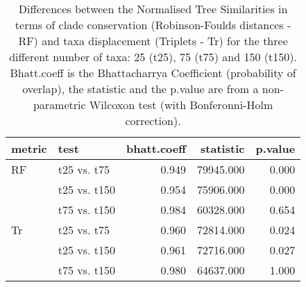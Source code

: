 \begin{table}[ht]
\centering
\begin{tabular}{llr|rr}
  \hline
metric & test & bhatt.coeff & statistic & p.value \\ 
  \hline
RF & t25 vs. t75 & 0.949 & 79945.000 & 0.000 \\ 
   & t25 vs. t150 & 0.954 & 75906.000 & 0.000 \\ 
   & t75 vs. t150 & 0.984 & 60328.000 & 0.654 \\ 
  Tr & t25 vs. t75 & 0.960 & 72814.000 & 0.024 \\ 
   & t25 vs. t150 & 0.961 & 72716.000 & 0.027 \\ 
   & t75 vs. t150 & 0.980 & 64637.000 & 1.000 \\ 
   \hline
\end{tabular}
\caption{Differences between the Normalised Tree Similarities in terms of clade conservation (Robinson-Foulds distances - RF) and taxa displacement (Triplets - Tr) for the three different number of taxa: 25 (t25), 75 (t75) and 150 (t150). Bhatt.coeff is the Bhattacharrya Coefficient (probability of overlap), the statistic and the p.value are from a non-parametric Wilcoxon test (with Bonferonni-Holm correction).} 
\label{Tab_pooledstaxa_test}
\end{table}
